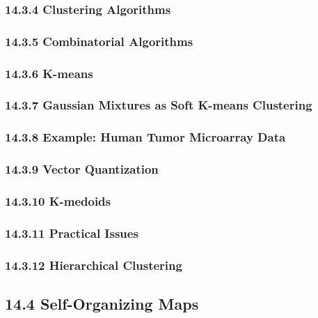\documentclass[11pt]{article}
\begin{document}
\begin{itemize}
  \subsubsection{14.3.4 Clustering
  Algorithms}\label{clustering-algorithms}

  \subsubsection{14.3.5 Combinatorial
  Algorithms}\label{combinatorial-algorithms}

  \subsubsection{14.3.6 K-means}\label{k-means}

  \subsubsection{14.3.7 Gaussian Mixtures as Soft K-means
  Clustering}\label{gaussian-mixtures-as-soft-k-means-clustering}

  \subsubsection{14.3.8 Example: Human Tumor Microarray
  Data}\label{example-human-tumor-microarray-data}

  \subsubsection{14.3.9 Vector Quantization}\label{vector-quantization}

  \subsubsection{14.3.10 K-medoids}\label{k-medoids}

  \subsubsection{14.3.11 Practical Issues}\label{practical-issues}

  \subsubsection{14.3.12 Hierarchical
  Clustering}\label{hierarchical-clustering}

  \subsection{14.4 Self-Organizing Maps}\label{self-organizing-maps}
\end{itemize}
\end{document}
